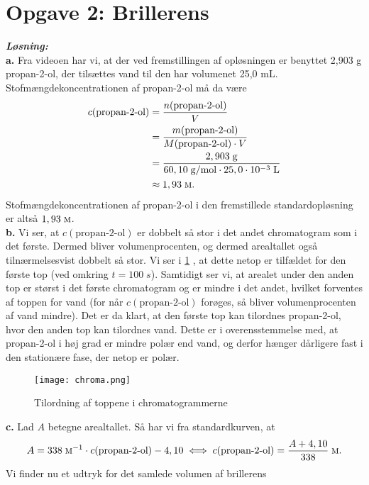 \documentclass{report}
\newcommand{\sol}{\setlength{\parindent}{0cm}\textbf{\textit{Løsning:}}\setlength{\parindent}{1cm}}
\begin{document}
\section*{Opgave 2: Brillerens}
\sol \\
\textbf{a.}
Fra videoen har vi, at der ved fremstillingen af opløsningen er benyttet 2,903 g propan-2-ol, der tilsættes vand til den har volumenet 25,0 mL.
Stofmængdekoncentrationen af propan-2-ol må da være
\begin{equation*}
\begin{split}
  c(\text{propan-2-ol} )&=\frac{n(\text{propan-2-ol} )}{V}\\
  &=\frac{m(\text{propan-2-ol} )}{M(\text{propan-2-ol}) \cdot V}\\
  &=\frac{2,903 \;\unit{g} }{60,10 \;\unit{g/mol} \cdot 25,0 \cdot 10 ^{-3} \;\unit{L} }\\
  &\approx 1,93 \;\unit{\textsc{m}}.
\end{split}
\end{equation*}
Stofmængdekoncentrationen af propan-2-ol i den fremstillede standardopløsning er altså $1,93 \;\unit{\textsc{m}} $.\\[1ex]
\textbf{b.}
Vi ser, at $c(\text{propan-2-ol} )$ er dobbelt så stor i det andet chromatogram som i det første. 
Dermed bliver volumenprocenten, og dermed arealtallet også tilnærmelsesvist dobbelt så stor.
Vi ser i \cref{fig:chroma} , at dette netop er tilfældet for den første top (ved omkring $t=100 \;\unit{s} $).
Samtidigt ser vi, at arealet under den anden top er størst i det første chromatogram og er mindre i det andet, hvilket forventes af toppen for vand (for når $c(\text{propan-2-ol} )$ forøges, så bliver volumenprocenten af vand mindre).
Det er da klart, at den første top kan tilordnes propan-2-ol, hvor den anden top kan tilordnes vand.
Dette er i overensstemmelse med, at propan-2-ol i høj grad er mindre polær end vand, og derfor hænger dårligere fast i den stationære fase, der netop er polær.
\begin{figure}[H]
\begin{center}
  \texttt{[image: chroma.png]}
\end{center}
\caption{Tilordning af toppene i chromatogrammerne}
\label{fig:chroma}
\end{figure}
\noindent \textbf{c.}
Lad $A$ betegne arealtallet. 
Så har vi fra standardkurven, at
\[
A=338 \;\unit{\textsc{m} ^{-1}} \cdot c(\text{propan-2-ol} ) -4,10 \iff c(\text{propan-2-ol})=\frac{A + 4,10}{338} \;\unit{\textsc{m}}. 
\] 
Vi finder nu et udtryk for det samlede volumen af brillerens
\end{document}
